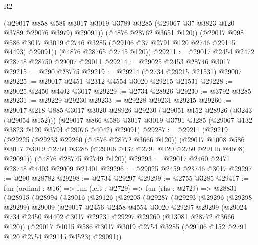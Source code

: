 \begin{lexlean}{R2}
\begin{coremodule}
            (@29017
              @858
              @586
              @3017
              @3019
              @3789
              @3285
              (@29067 @37 @3823 @120 @3789 @29076 @3979)
              @29091))
          (@4876 @28762 @3651 @120))
        (@29017
          @998
          @586
          @3017
          @3019
          @2746
          @3285
          (@29106 @37 @2791 @120 @2746 @29115 @4493)
          @29091))
      (@4876 @28765 @2745 @120))
@29211 := @29017 @2454 @2472 @28748 @28750 @29007 @29011
@29214 := @29025 @2453 @28746 @3017
@29215 := @290 @28775
@29219 := @29214 (@2734 @29215 @21531) @29007
@29225 := @29017 @2451 @2312 @4554 @3020 @29215 @21531
@29228 := @29025 @2450 @4402 @3017
@29229 := @2734 @28926
@29230 := @3792 @3285
@29231 := @29229 @29230
@29233 := @29228 @29231 @29215
@29260 := @29017
    @218
    @885
    @3017
    @3020
    @28926
    @29230
    (@29051 @152 @28926 (@3243 (@29054 @152)))
    (@29017 @866 @586 @3017 @3019 @3791 @3285 (@29067 @132 @3823 @120 @3791 @29076 @4042) @29091)
@29287 := @29211
    (@29219
      (@29225
        (@29233 @29260 (@4876 @28772 @3666 @120))
        (@29017
          @1008
          @586
          @3017
          @3019
          @2750
          @3285
          (@29106 @132 @2791 @120 @2750 @29115 @4508)
          @29091))
      (@4876 @28775 @2749 @120))
@29293 := @29017 @2460 @2471 @28748 @4403 @29009 @21401
@29296 := @29025 @2459 @28746 @3017
@29297 := @290 @28782
@29298 := @2734 @29297
@29299 := @2755 @3285
@29417 := fun (ordinal : @16) =>
  fun (left : @2729) =>
  fun (rhs : @2729) =>
  @28831
    (@28915
      (@28994
        (@29016
          (@29126
            (@29205
              (@29287
                (@29293
                  (@29296
                    (@29298 @29299)
                    @29009
                    (@29017
                      @2456
                      @2458
                      @4554
                      @3020
                      @29297
                      @29299
                      (@29024
                        @734
                        @2450
                        @4402
                        @3017
                        @29231
                        @29297
                        @29260
                        (@13081 @28772 @3666 @120))
                      (@29017
                        @1015
                        @586
                        @3017
                        @3019
                        @2754
                        @3285
                        (@29106 @152 @2791 @120 @2754 @29115 @4523)
                        @29091))

\end{coremodule}
\end{lexlean}
